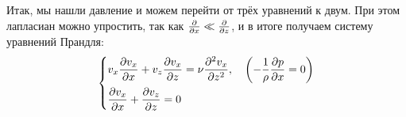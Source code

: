 Итак, мы нашли давление и можем перейти от трёх уравнений к двум. При этом лапласиан можно упростить, так как $\pdv{x} \ll \pdv{z}$, и в итоге получаем систему уравнений Прандля:
\begin{gather}
	\label{eq:prandtl}
    \left\{\begin{aligned}
        &v_x \pdv{v_x}{x}+v_z\pdv{v_x}{z}=\nu\pdv[2]{v_x}{z}, \quad
        \qty(-\frac{1}{\rho}\pdv{p}{x}=0)\\
        &\pdv{v_x}{x}+\pdv{v_z}{z}=0
    \end{aligned}\right.
    \end{gather}





